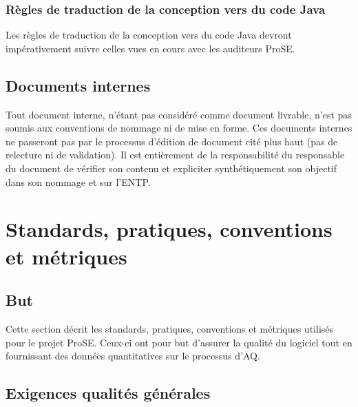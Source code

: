 \documentclass[a4paper,11pt,titlepage]{article}
\begin{document}
\subsubsection{Règles de traduction de la conception vers du code Java}
Les règles de traduction de la conception vers du code Java
devront impérativement suivre celles vues en cours avec les auditeurs ProSE.\\


\subsection{Documents internes}
Tout document interne, n'étant pas considéré comme document livrable,
n'est pas soumis aux conventions de nommage ni de mise en forme.
Ces documents internes ne passeront pas par le processus d'édition de
document cité plus haut (pas de relecture ni de validation). Il est
entièrement de la responsabilité du responsable du document de vérifier
son contenu et expliciter synthétiquement son objectif dans son nommage
et sur l'ENTP.
\section{Standards, pratiques, conventions et métriques}
\subsection{But}
Cette section décrit les standards, pratiques, conventions et métriques
utilisés pour le projet ProSE.  Ceux-ci ont pour but d'assurer la
qualité du logiciel tout en fournissant des données quantitatives
sur le processus d'AQ.
\subsection{Exigences qualités générales}
\end{document}
